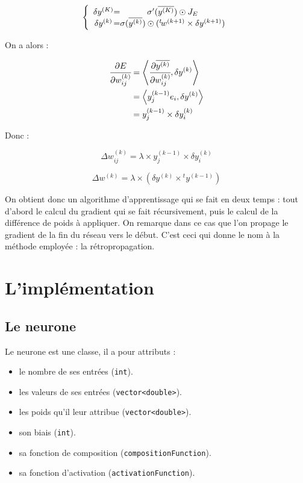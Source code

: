 \[
\left \{
\begin{array}{c @{=} c}
    \delta y^{(K)} & \sigma'(\overline{y^{(K)}}) \odot J_E\\
    \delta y^{(k)} & \sigma(\overline{y^{(k)}}) \odot ({}^t \! w^{(k+1)} \times \delta y^{(k+1)})\\
\end{array}
\right.
\]

On a alors :

\begin{align*}
\cfrac{\partial E}{\partial w_{ij}^{(k)}} &= \left\langle\cfrac{\partial \overline{y^{(k)}}}{\partial w_{ij}^{(k)}} ,\delta y^{(k)}\right\rangle\\
&= \left\langle y^{(k-1)}_j e_i,\delta y^{(k)}\right\rangle\\
& = y^{(k-1)}_j \times \delta y^{(k)}_i
\end{align*}

Donc :

\[\Delta w^{(k)}_{ij} = \lambda \times y^{(k-1)}_j \times \delta y^{(k)}_i\]

\[\Delta w^{(k)} = \lambda \times (\delta y^{(k)} \times {}^t \! y^{(k-1)})\]

On obtient donc un algorithme d'apprentissage qui se fait en deux temps : tout
d'abord le calcul du gradient qui se fait récursivement, puis le calcul de la
différence de poids à appliquer. On remarque dans ce cas que l'on propage le
gradient de la fin du réseau vers le début. C'est ceci qui donne le nom à la
méthode employée : la rétropropagation.

\section{L'implémentation}

\subsection{Le neurone}

Le neurone est une classe, il a pour attributs :
\begin{itemize}
  \item le nombre de ses entrées (\verb+int+).
  \item les valeurs de ses entrées (\verb+vector<double>+).
  \item les poids qu'il leur attribue (\verb+vector<double>+).
  \item son biais (\verb+int+).
  \item sa fonction de composition (\verb+compositionFunction+).
  \item sa fonction d'activation (\verb+activationFunction+).
\end{itemize}

